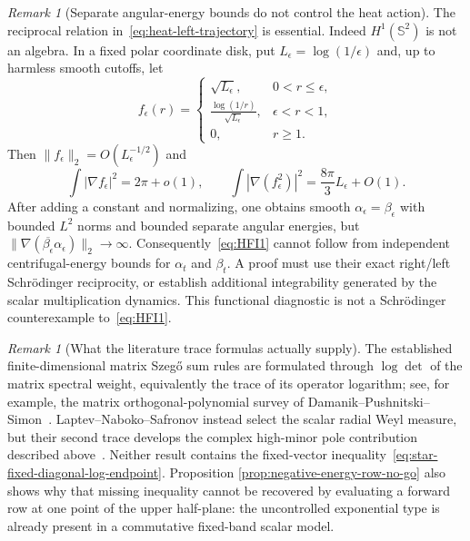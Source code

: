 \documentclass[11pt]{article}
\theoremstyle{definition}
\theoremstyle{remark}
\newtheorem{remark}[theorem]{Remark}
\begin{document}
\begin{remark}[Separate angular-energy bounds do not control the heat action]
\label{rem:H1-product-criticality}
The reciprocal relation in~\eqref{eq:heat-left-trajectory} is essential.
Indeed $H^1(\mathbb S^2)$ is not an algebra.  In a fixed polar coordinate disk,
put $L_\epsilon=\log(1/\epsilon)$ and, up to harmless smooth cutoffs, let
\begin{equation}
 f_\epsilon(r)=\begin{cases}
  \sqrt{L_\epsilon},&0<r\leq\epsilon,\\[1mm]
  \displaystyle\frac{\log(1/r)}{\sqrt{L_\epsilon}},
     &\epsilon<r<1,\\[2mm]
 0,&r\geq1.
 \end{cases}
 \label{eq:Moser-product-test}
\end{equation}
Then $\|f_\epsilon\|_2=O(L_\epsilon^{-1/2})$ and
\begin{equation}
 \int|\nabla f_\epsilon|^2=2\pi+o(1),
 \qquad
 \int|\nabla(f_\epsilon^2)|^2
 =\frac{8\pi}{3}L_\epsilon+O(1).
 \label{eq:Moser-product-divergence}
\end{equation}
After adding a constant and normalizing, one obtains smooth
$\alpha_\epsilon=\beta_\epsilon$ with bounded $L^2$ norms and bounded separate
angular energies, but
$\|\nabla(\overline{\beta_\epsilon}\alpha_\epsilon)\|_2\to\infty$.
Consequently~\eqref{eq:HFI1} cannot follow from independent centrifugal-energy
bounds for $\alpha_t$ and $\beta_t$.  A proof must use their exact right/left
Schr\"odinger reciprocity, or establish additional integrability generated by
the scalar multiplication dynamics.  This functional diagnostic is not a
Schr\"odinger counterexample to~\eqref{eq:HFI1}.
\end{remark}

\begin{remark}[What the literature trace formulas actually supply]
\label{rem:matrix-szego-literature-audit}
The established finite-dimensional matrix Szeg\H{o} sum rules are formulated
through $\log\det$ of the matrix spectral weight, equivalently the trace of
its operator logarithm; see, for example, the matrix orthogonal-polynomial
survey of Damanik--Pushnitski--Simon~\cite{DamanikPushnitskiSimon2008}.
Laptev--Naboko--Safronov instead select the scalar radial Weyl measure, but
their second trace develops the complex high-minor pole contribution
described above~\cite{LNS2005}.  Neither result contains the fixed-vector
inequality~\eqref{eq:star-fixed-diagonal-log-endpoint}.  Proposition
\ref{prop:negative-energy-row-no-go} also shows why that missing inequality
cannot be recovered by evaluating a forward row at one point of the upper
half-plane: the uncontrolled exponential type is already present in a
commutative fixed-band scalar model.
\end{remark}
\end{document}
